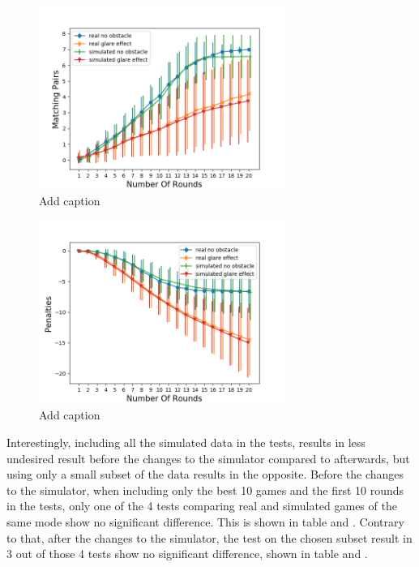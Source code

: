 \begin{minipage}{0.5\textwidth}
	\begin{figure}[H]
		\centering
		\includegraphics[width=8cm]{images/sd10x/Figure_3.png}
		\caption[Bild kurz]{Add caption}
		\label{fig:simOp101}
	\end{figure}
\end{minipage}
\begin{minipage}{0.5\textwidth}
	\begin{figure}[H]
		\centering
		\includegraphics[width=8cm]{images/sd10x/Figure_4.png}
		\caption[Bild kurz]{Add caption}
		\label{fig:simOp102}
	\end{figure}
\end{minipage} 

Interestingly, including all the simulated data in the tests, results in less undesired result before the changes to the simulator compared to afterwards, but using only a small subset of the data results in the opposite. Before the changes to the simulator, when including only the best 10 games and the first 10 rounds in the tests, only one of the 4 tests comparing real and simulated games of the same mode show no significant difference. This is shown in table  and . Contrary to that, after the changes to the simulator, the test on the chosen subset result in 3 out of those 4 tests show no significant difference, shown in table  and . 

